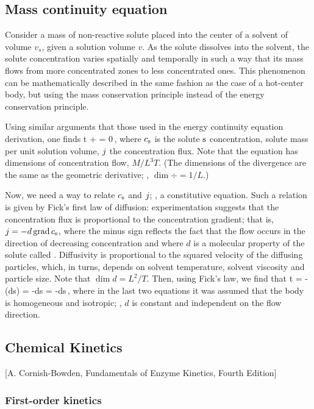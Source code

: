 \subsection{Mass continuity equation}
Consider a mass of non-reactive solute placed into the center of a solvent of volume $v_s$, given a solution volume $v$. As the solute dissolves into the solvent, the solute concentration varies spatially and temporally in such a way that its mass flows from more concentrated zones to less concentrated ones. This phenomenon can be mathematically described in the same fashion as the case of a hot-center body, but using the mass conservation principle instead of the energy conservation principle.

Using similar arguments that those used in the energy continuity equation derivation, one finds
\beq
{}t + \div\flux = 0\,,
\eeq
where $\conc s$ is the solute $\ce s$ concentration, solute mass per unit solution volume, $j$ the concentration flux. Note that the equation has dimensions of concentration flow, $M/L^3T$. (The dimensions of the divergence are the same as the geometric derivative; \ie, $\dim\div = 1/L$.)

Now, we need a way to relate $\conc s$ and $j$; \ie, a constitutive equation. Such a relation is given by Fick's first law of diffusion: experimentation suggests that the concentration flux is proportional to the concentration gradient; that is, $\flux = -d\grad\conc s$, where the minus sign reflects the fact that the flow occurs in the direction of decreasing concentration and where $d$ is a molecular property of the solute called . Diffusivity is proportional to the squared velocity of the diffusing particles, which, in turns, depends on solvent temperature, solvent viscosity and particle size. Note that $\dim d = L^2/T$. Then, using Fick's law, we find that
\beq
{}t = -\div\left(d\grad\conc s\right) = -d\lap\conc s = -d\lder\conc s\,,
\eeq
where in the last two equations it was assumed that the body is homogeneous and isotropic; \ie, $d$ is constant and independent on the flow direction.


\subsection{Chemical Kinetics}

[A. Cornish-Bowden, Fundamentals of Enzyme Kinetics, Fourth Edition]

\subsubsection{First-order kinetics}

